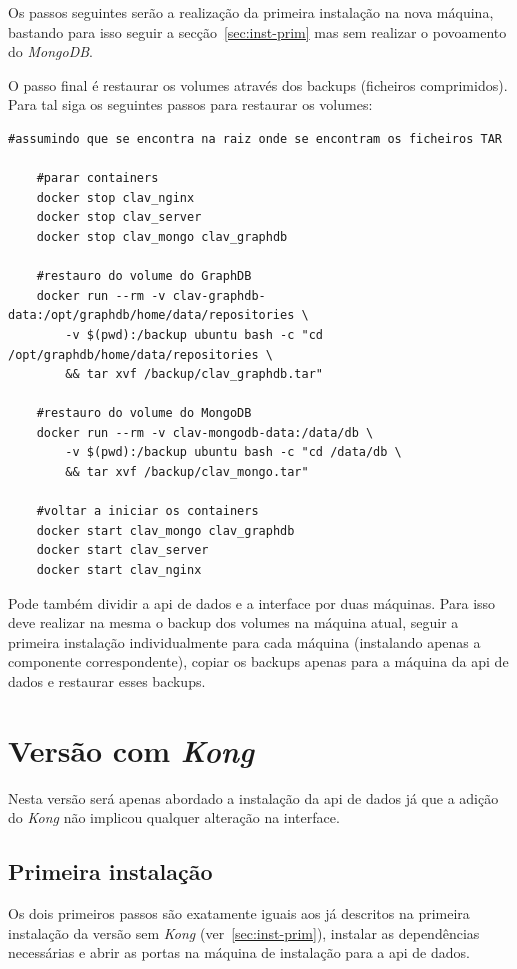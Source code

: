 Os passos seguintes serão a realização da primeira instalação na nova máquina, bastando para isso seguir a secção~\ref{sec:inst-prim} mas sem realizar o povoamento do \textit{MongoDB}.

O passo final é restaurar os volumes através dos backups (ficheiros comprimidos). Para tal siga os seguintes passos para restaurar os volumes:
\begin{lstlisting}[caption=Restauro dos volumes do \textit{docker}]
    #assumindo que se encontra na raiz onde se encontram os ficheiros TAR

    #parar containers
    docker stop clav_nginx
    docker stop clav_server
    docker stop clav_mongo clav_graphdb
    
    #restauro do volume do GraphDB
    docker run --rm -v clav-graphdb-data:/opt/graphdb/home/data/repositories \
        -v $(pwd):/backup ubuntu bash -c "cd /opt/graphdb/home/data/repositories \
        && tar xvf /backup/clav_graphdb.tar"
        
    #restauro do volume do MongoDB
    docker run --rm -v clav-mongodb-data:/data/db \
        -v $(pwd):/backup ubuntu bash -c "cd /data/db \
        && tar xvf /backup/clav_mongo.tar"
        
    #voltar a iniciar os containers
    docker start clav_mongo clav_graphdb
    docker start clav_server
    docker start clav_nginx
\end{lstlisting}

Pode também dividir a \acrshort{api} de dados e a interface por duas máquinas. Para isso deve realizar na mesma o backup dos volumes na máquina atual, seguir a primeira instalação individualmente para cada máquina (instalando apenas a componente correspondente), copiar os backups apenas para a máquina da \acrshort{api} de dados e restaurar esses backups.

\section{Versão com \textit{Kong}}\label{sec:deployKong}

Nesta versão será apenas abordado a instalação da \acrshort{api} de dados já que a adição do \textit{Kong} não implicou qualquer alteração na interface.

\subsection{Primeira instalação}

Os dois primeiros passos são exatamente iguais aos já descritos na primeira instalação da versão sem \textit{Kong} (ver~\ref{sec:inst-prim}), instalar as dependências necessárias e abrir as portas na máquina de instalação para a \acrshort{api} de dados.

